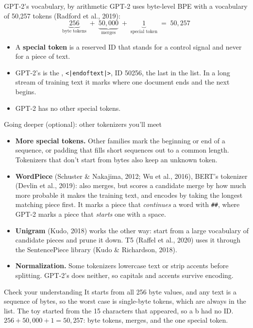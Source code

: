\documentclass[aspectratio=169,11pt,t,\primeropts]{beamer}
\newcommand\tok[1]{\texttt{#1}}
\begin{document}
\begin{frame}{GPT-2's vocabulary, by arithmetic}
  GPT-2 uses byte-level BPE with a vocabulary of 50,257 tokens (Radford et al., 2019):
  \[
    \underbrace{256}_{\text{byte tokens}} \;+\; \underbrace{50{,}000}_{\text{merges}}
    \;+\; \underbrace{1}_{\text{special token}} \;=\; 50{,}257
  \]
  \pause
  \begin{itemize}
    \item A \textbf{special token} is a reserved ID that stands for a control signal and never for a
      piece of text.
    \item GPT-2's is the , \tok{<|endoftext|>}, ID 50256, the last in the
      list. In a long stream of training text it marks where one document ends and the next
      begins.
    \item GPT-2 has no other special tokens.
  \end{itemize}
\end{frame}

\begin{frame}{Going deeper (optional): other tokenizers you'll meet}
  \small
  \begin{itemize}
    \item \textbf{More special tokens.} Other families mark the beginning or end of a sequence, or
      padding that fills short sequences out to a common length. Tokenizers that don't start from
      bytes also keep an unknown token.
    \item \textbf{WordPiece} (Schuster \& Nakajima, 2012; Wu et al., 2016), BERT's tokenizer
      (Devlin et al., 2019): also merges, but scores a candidate merge by how much more probable it
      makes the training text, and encodes by taking the longest matching piece first. It marks a
      piece that \emph{continues} a word with \tok{\#\#}, where GPT-2 marks a piece that
      \emph{starts} one with a space.
    \item \textbf{Unigram} (Kudo, 2018) works the other way: start from a large vocabulary of
      candidate pieces and prune it down. T5 (Raffel et al., 2020) uses it through the
      SentencePiece library (Kudo \& Richardson, 2018).
    \item \textbf{Normalization.} Some tokenizers lowercase text or strip accents before
      splitting. GPT-2's does neither, so capitals and accents survive encoding.
  \end{itemize}
\end{frame}

\begin{frame}{Check your understanding}
  {It starts from all 256 byte values, and any text is a sequence of bytes, so the worst case is
    single-byte tokens, which are always in the list. The toy started from the 15 characters that
    appeared, so a b had no ID. $256 + 50{,}000 + 1 = 50{,}257$: byte tokens, merges, and the one
    special token.}
\end{frame}
\end{document}
